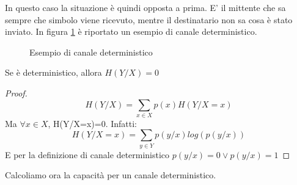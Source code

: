In questo caso la situazione è quindi opposta a prima. E' il mittente che sa sempre che simbolo viene ricevuto, mentre 
il destinatario non sa cosa è stato inviato.
In figura \ref{fig:deterministico} è riportato un esempio di canale deterministico.

\begin{figure}[htbp]
  \centering
  \hspace{1cm}
  \caption{Esempio di canale deterministico}
  \label{fig:deterministico}
\end{figure}

\begin{lemma}
 Se  è deterministico, allora $H(Y/X)=0$
 \begin{proof}
  \[
   H(Y/X)=\sum_{x \in X} p(x)H(Y/X=x)
  \]
  Ma $\forall x \in X$, H(Y/X=x)=0. Infatti:
  \[
   H(Y/X=x)=\sum_{y \in Y}p(y/x) log(p(y/x))
  \]
  E per la definizione di canale deterministico $p(y/x)=0 \lor p(y/x)=1$
 \end{proof}
\end{lemma}

Calcoliamo ora la capacità per un canale deterministico.

